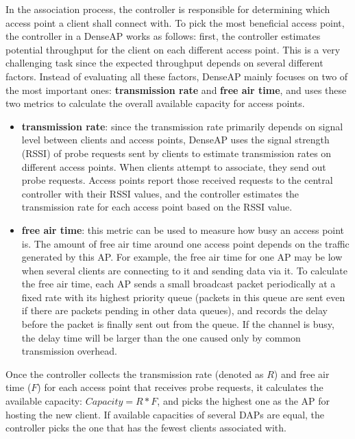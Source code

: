 \documentclass[english]{tktltiki}
\begin{document}
In the association process, the controller is responsible for determining which access point a client shall connect with. To pick the most beneficial access point, the controller in a DenseAP works as follows: first, the controller estimates potential throughput for the client on each different access point. This is a very challenging task since the expected throughput depends on several different factors. Instead of evaluating all these factors, DenseAP mainly focuses on two of the most important ones: \textbf{transmission rate} and \textbf{free air time}, and uses these two metrics to calculate the overall available capacity for access points.

\begin{itemize}
  \item \textbf{transmission rate}: since the transmission rate primarily depends on signal level between clients and access points, DenseAP uses the signal strength (RSSI) of probe requests sent by clients to estimate transmission rates on different access points. When clients attempt to associate, they send out probe requests. Access points report those received requests to the central controller with their RSSI values, and the controller estimates the transmission rate for each access point based on the RSSI value.
  \item \textbf{free air time}: this metric can be used to measure how busy an access point is. The amount of free air time around one access point depends on the traffic generated by this AP. For example, the free air time for one AP may be low when several clients are connecting to it and sending data via it. To calculate the free air time, each AP sends a small broadcast packet periodically at a fixed rate with its highest priority queue (packets in this queue are sent even if there are packets pending in other data queues), and records the delay before the packet is finally sent out from the queue. If the channel is busy, the delay time will be larger than the one caused only by common transmission overhead.
\end{itemize}

Once the controller collects the transmission rate (denoted as $R$) and free air time ($F$) for each access point that receives probe requests, it calculates the available capacity: $Capacity = R * F$, and picks the highest one as the AP for hosting the new client. If available capacities of several DAPs are equal, the controller picks the one that has the fewest clients associated with.
\end{document}
